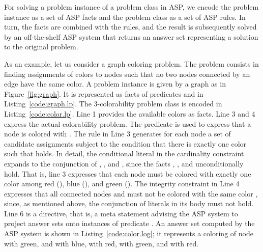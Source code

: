 
%

%

%


For solving a problem instance of a problem class in ASP, 
we encode the problem instance as a set of ASP facts and the problem
class as a set of ASP rules.
In turn, the facts are combined with the rules, 
and the result is
subsequently solved by an off-the-shelf ASP system that returns
an answer set representing a solution to the original problem.

As an example, let us consider a graph coloring problem.
The problem consists in finding
assignments of colors to nodes such that no two nodes connected by an
edge have the same color. 
A problem instance is given by a graph as in Figure~\ref{fig:graph}.
%
It is represented as facts of predicates
 and  in Listing~\ref{code:graph.lp}.
The 3-colorability problem class is encoded in Listing~\ref{code:color.lp}.
%
Line 1 provides the available colors as facts.
Line 3 and 4 express the actual colorability problem.
The predicate  is used to express that a node
 is colored with .
%
The rule in Line 3 generates for each node  a set of candidate assignments
subject to the condition that there is exactly one color  such that  holds.
In detail, the conditional literal
in the cardinality constraint
expands to the conjunction of 
, , and , since
the facts , , and  unconditionally hold.
That is, line 3 expresses that each node  must be colored with
exactly one color among red (), blue (), and green ().
%
The integrity constraint in Line 4 expresses that all connected nodes
 and  must not be colored with the same color ,
since, as mentioned above, 
the conjunction of literals in its body must not hold. 
%
Line 6 is a directive, that is, a meta statement advising the ASP system to project answer sets
onto instances of predicate .
%
An answer set computed by the ASP system {\clingo} is shown in
Listing~\ref{code:color.log}; 
it represents a coloring of node  with green,
 and  with blue, 
 with red, 
 with green, and 
 with red.

